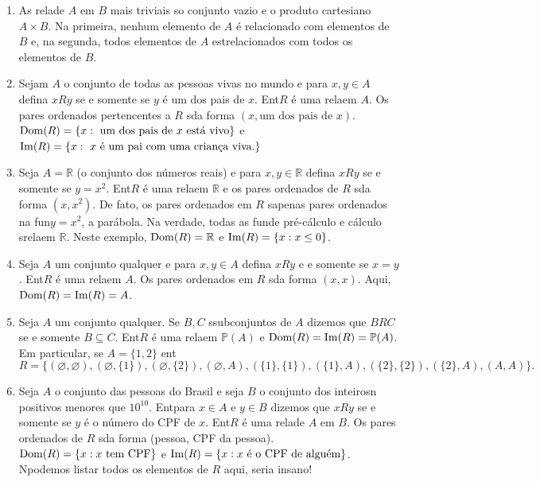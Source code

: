 \begin{enumerate}[{\bf 1.}]

\item As rela\coes de $A$ em $B$ mais triviais s\ao o conjunto vazio e o produto cartesiano $A\times B$. Na primeira, nenhum elemento de $A$ \'e relacionado com elementos de $B$ e, na segunda, todos elementos de $A$ est\ao relacionados com todos os elementos de $B$. 

\item\label{relex1} Sejam $A$ o conjunto de todas as pessoas vivas no mundo e para $x,y\in A$ defina $xRy$ se e somente se $y$ \'e um dos pais de $x$. Ent\ao $R$ \'e uma rela\cao em $A$. Os pares ordenados pertencentes a $R$ s\ao da forma $(x,\textrm{um dos pais de $x$})$. $\operatorname{Dom}(R)=\{x: \textrm{ um dos pais de $x$ est\'a vivo}\}$ e $\Ima(R)=\{x: \textrm{ $x$ \'e um pai com uma crian\cc a viva.}\}$  

\item\label{relex2} Seja $A=\mathbb{R}$ (o conjunto dos n\'umeros reais) e para $x,y\in \mathbb{R}$ defina $xRy$ se e somente se $y=x^2$. Ent\ao $R$ \'e uma rela\cao em $\mathbb{R}$ e os pares ordenados de $R$ s\ao da forma $(x,x^2)$. De fato, os pares ordenados em $R$ s\ao apenas pares ordenados na fun\cao $y=x^2$, a par\'abola. Na verdade, todas as fun\coes de pr\'e-c\'alculo e c\'alculo s\ao rela\coes em $\mathbb{R}$. Neste exemplo, $\operatorname{Dom}(R)=\mathbb{R}$ e $\operatorname{Im}(R)=\{x: x\leq 0\}$.

\item\label{relex3} Seja $A$ um conjunto qualquer e para $x,y\in A$ defina $xRy$ e e somente se $x=y$. Ent\ao $R$ \'e uma rela\cao em $A$. Os pares ordenados em $R$ s\ao da forma $(x,x)$. Aqui, $\operatorname{Dom}(R)=\operatorname{Im}(R)=A$.

\item\label{relex4} Seja $A$ um conjunto qualquer. Se $B,C$ s\ao subconjuntos de $A$ dizemos que $BRC$ se e somente $B\subseteq C$. Ent\ao $R$ \'e uma rela\cao em $\mathbb{P}(A)$ e $\operatorname{Dom}(R)=\operatorname{Im}(R)=\mathbb{P}(A)$. Em particular, se $A=\{1,2\}$ ent\ao
\[
R=\{(\varnothing,\varnothing),(\varnothing,\{1\}),(\varnothing,\{2\}),(\varnothing,A),(\{1\},\{1\}),(\{1\},A),(\{2\},\{2\}),(\{2\},A),(A,A)\}.
\]

\item\label{relex5} Seja $A$ o conjunto das pessoas do Brasil e seja $B$ o conjunto dos inteirosn positivos menores que $10^{10}$. Ent\ao para $x\in A$ e $y\in B$ dizemos que $xRy$ se e somente se $y$ \'e o n\'umero do CPF de $x$. Ent\ao $R$ \'e uma rela\cao de $A$ em $B$. Os pares ordenados de $R$ s\ao da forma (pessoa, CPF da pessoa).  $\operatorname{Dom}(R)=\{x: x \textrm{ tem CPF}\}$ e $\operatorname{Im}(R)=\{x: x \textrm{ \'e o CPF de algu\'em}\}$. N\ao podemos listar todos os elementos de $R$ aqui, seria insano!


\end{enumerate}
